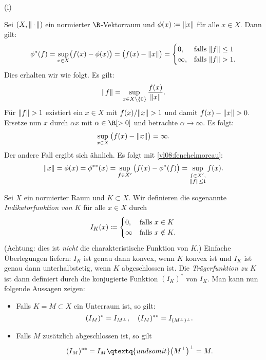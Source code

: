 \pagebreak[2]
\begin{BspList}[\label{vl08:bsp4.33}]{(i)}
\item \label{vl08:bsp4.33:i}
    Sei $(X,\lVert\,\cdot\,\rVert)$ ein normierter $\R$-Vektorraum und
    $\phi(x)\coloneqq\lVert x\rVert$ für alle $x\in X$. Dann gilt:
    \[ \phi^\ast(f) = \sup_{x\in X} \bigl( f(x) - \phi(x) \bigr)
        = \bigl( f(x) - \lVert x\rVert \bigr)
        = \begin{cases}
            0,      &\text{falls } \lVert f\rVert \leq 1   \\
            \infty, &\text{falls } \lVert f\rVert > 1      .
        \end{cases}
    \]
    Dies erhalten wir wie folgt. Es gilt:
    \[ \lVert f\rVert = \sup_{x\in X\setminus\{0\}} \frac{f(x)}{\lVert x\rVert}  . \]
    Für $\lVert f\rVert > 1$ existiert ein $x\in X$ mit $f(x)/\lVert x\rVert > 1$ und damit
    $f(x) - \lVert x\rVert > 0$. Ersetze nun $x$ durch $\alpha x$ mit $\alpha\in\R[>0]$
    und betrachte $\alpha\to\infty$. Es folgt:
    \[ \sup_{x\in X} \, \bigl( f(x) - \lVert x\rVert \bigr) = \infty . \]
    Der andere Fall ergibt sich ähnlich. 
    Es folgt mit \cref{vl08:fenchelmoreau}:
    \[ \lVert x\rVert = \phi(x) = \phi^{\ast\ast}(x) 
        = \sup_{f\in X'} \, \bigl( f(x) - \phi^\ast(f) \bigr)
        = \sup_{\substack{f\in X',\\\lVert f\rVert\leq1}} f(x)
    . \]
    
\item \label{vl08:bsp4.33:ii}
    Sei $X$ ein normierter Raum und $K\subset X$. Wir definieren die
    sogenannte \emph{Indikatorfunktion von $K$} für alle $x\in X$ durch
    \[ I_K(x) \coloneqq \begin{cases}
            0,      & \text{falls } x\in K      \\
            \infty  & \text{falls } x\notin K   .
        \end{cases}
    \]
    (Achtung: dies ist \emph{nicht} die charakteristische Funktion von $K$.)
    Einfache Überlegungen liefern: $I_K$ ist genau dann konvex, wenn $K$ konvex
    ist und $I_K$ ist genau dann unterhalbstetig, wenn $K$ abgeschlossen ist.
    Die \emph{Trägerfunktion zu $K$} ist dann definiert durch
    die konjugierte Funktion $(I_K)^\ast$ von $I_K$.
    Man kann nun folgende Aussagen zeigen:
    \begin{itemize}
        \item
            Falls $K=M \subset X$ ein Unterraum ist, so gilt:
            \[ (I_M)^\ast = I_{M^\perp}, \quad (I_M)^{\ast\ast} = I_{(M^\perp)^\perp}
            . \]
        \item
            Falls $M$ zusätzlich abgeschlossen ist, so gilt
            \[ (I_M)^\dast = I_M \qtextq{und somit} 
                \bigl( M^\perp \bigr)^\perp = M
            . \]
    \end{itemize}
    

\end{BspList}
